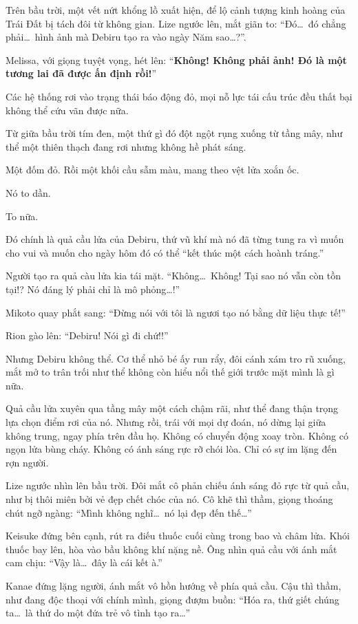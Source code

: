 \documentclass[../main.tex]{subfiles}
\begin{document}
Trên bầu trời, một vết nứt khổng lồ xuất hiện, để lộ cảnh tượng kinh hoàng của Trái Đất bị tách đôi từ không gian. Lize ngước lên, mắt giãn to: ``Đó\dots\ đó chẳng phải\dots\ hình ảnh mà Debiru tạo ra vào ngày Năm sao\dots?''.

Melissa, với giọng tuyệt vọng, hét lên: ``\textbf{Không! Không phải ảnh! Đó là một tương lai đã được ấn định rồi!}''

Các hệ thống rơi vào trạng thái báo động đỏ, mọi nỗ lực tái cấu trúc đều thất bại không thể cứu vãn được nữa.

Từ giữa bầu trời tím đen, một thứ gì đó đột ngột rụng xuống từ tầng mây, như thể một thiên thạch đang rơi nhưng không hề phát sáng.

Một đốm đỏ. Rồi một khối cầu sẫm màu, mang theo vệt lửa xoắn ốc.

Nó to dần.

To nữa.

Đó chính là quả cầu lửa của Debiru, thứ vũ khí mà nó đã từng tung ra vì muốn cho vui và muốn cho ngày hôm đó có thể ``kết thúc một cách hoành tráng.''

Người tạo ra quả càu lửa kia tái mặt. ``Không\dots\ Không! Tại sao nó vẫn còn tồn tại!? Nó đáng lý phải chỉ là mô phỏng\dots!''

Mikoto quay phắt sang: ``Đừng nói với tôi là ngươi tạo nó bằng dữ liệu thực tế!''

Rion gào lên: ``Debiru! Nói gì đi chứ!!''

Nhưng Debiru không thể. Cơ thể nhỏ bé ấy run rẩy, đôi cánh xám tro rũ xuống, mắt mở to trân trối như thể không còn hiểu nổi thế giới trước mặt mình là gì nữa.

Quả cầu lửa xuyên qua tầng mây một cách chậm rãi, như thể đang thận trọng lựa chọn điểm rơi của nó. Nhưng rồi, trái với mọi dự đoán, nó dừng lại giữa không trung, ngay phía trên đầu họ. Không có chuyển động xoay tròn. Không có ngọn lửa bùng cháy. Không có ánh sáng rực rỡ chói lòa. Chỉ có sự im lặng đến rợn người.

Lize ngước nhìn lên bầu trời. Đôi mắt cô phản chiếu ánh sáng đỏ rực từ quả cầu, như bị thôi miên bởi vẻ đẹp chết chóc của nó. Cô khẽ thì thầm, giọng thoáng chút ngỡ ngàng: ``Mình không nghĩ\dots\ nó lại đẹp đến thế\dots''

Keisuke đứng bên cạnh, rút ra điếu thuốc cuối cùng trong bao và châm lửa. Khói thuốc bay lên, hòa vào bầu không khí nặng nề. Ông nhìn quả cầu với ánh mắt cam chịu: ``Vậy là\dots\ đây là cái kết à.''

Kanae đứng lặng người, ánh mắt vô hồn hướng về phía quả cầu. Cậu thì thầm, như đang độc thoại với chính mình, giọng đượm buồn: ``Hóa ra, thứ giết chúng ta\dots\ là thứ do một đứa trẻ vô tình tạo ra\dots''
\end{document}
